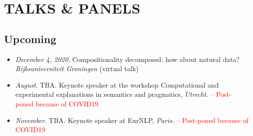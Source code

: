 \section{TALKS \& PANELS}

\subsection{Upcoming}
\begin{itemize}
\setlength\itemsep{5pt}
\item \textit{December 4, 2020}, Compositionality decomposed: how about natural data? \textit{Rijksuniversiteit Groningen} (virtual talk)
    \item \textit{August}. TBA. Keynote speaker at the workshop Computational and experimental explanations in semantics and pragmatics, \textit{Utrecht}. \textcolor{red}{ -- Post-poned because of COVID19}
    \item \textit{November}. TBA. Keynote speaker at EurNLP, \textit{Paris}. \textcolor{red}{ -- Post-poned because of COVID19}
\end{itemize}

